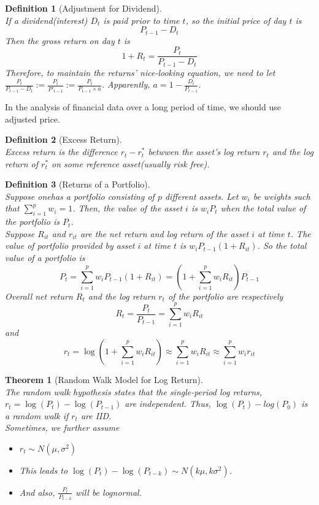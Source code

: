 \documentclass[12pt]{article}
\newtheorem{definition}{Definition}[section]
\newtheorem{theorem}{Theorem}[section]
\theoremstyle{definition}
\begin{document}
\begin{definition}[Adjustment for Dividend]
\hfill\\\normalfont If a dividend(interest) $D_t$ is paid prior to time $t$, so the initial price of day $t$ is 
\[
P_{t-1}-D_t
\]
Then the gross return on day $t$ is
\[
1+R_t=\frac{P_t}{P_{t-1}-D_t}
\]
Therefore, to maintain the returns' nice-looking equation, we need to let $\frac{P_t}{P_{t-1}-D_t}:=\frac{P_t}{P'_{t-1}}:=\frac{P_t}{P_{t-1}\times a}$.
Apparently, $a=1-\frac{D_t}{P_{t-1}}$.
\end{definition}
In the analysis of financial data over a long period of time, we should use adjusted price.
\begin{definition}[Excess Return]
\hfill\\\normalfont Excess return is the difference $r_t-r_t^\ast$ betwwen the asset's log return $r_t$ and the log return of $r_t^\ast$ on some reference asset(usually risk free).
\end{definition}
\begin{definition}[Returns of a Portfolio]
\hfill\\\normalfont Suppose onehas a portfolio consisting of $p$ different assets. Let $w_i$ be weights such that $\sum_{i=1}^p w_i = 1$. Then, the value of the asset $i$ is $w_iP_t$ when the total value of the portfolio is $P_t$.\\
Suppose $R_{it}$ and $r_{it}$ are the net return and log return of the asset $i$ at time $t$. The value of portfolio provided by asset $i$ at time $t$ is $w_iP_{t-1}(1+R_{it})$. So the total value of a portfolio is
\[
P_t=\sum_{i=1}^p w_{i}P_{t-1}(1+R_{it}) = (1+\sum_{i=1}^p w_iR_{it})P_{t-1}
\]
Overall net return $R_t$ and the log return $r_t$ of the portfolio are respectively
\[
R_t=\frac{P_t}{P_{t-1}}=\sum_{i=1}^p w_iR_{it}
\]
and
\[
r_t=\log(1+\sum_{i=1}^p w_iR_{it})\approx \sum_{i=1}^p w_iR_{it} \approx\sum_{i=1}^p w_ir_{it}
\]
\end{definition}
\begin{theorem}[Random Walk Model for Log Return]
\hfill\\\normalfont The random walk hypothesis states that the single-period log returns, $r_t=\log(P_t)-\log(P_{t-1})$ are independent. Thus, $\log(P_t) - log(P_0)$ is a random walk if $r_t$ are IID.\\
Sometimes, we further assume
\begin{itemize}
  \item $r_t\sim N(\mu, \sigma^2)$
  \item This leads to $\log(P_t)-\log(P_{t-k})\sim N(k\mu,k\sigma^2)$.
  \item And also, $\frac{P_t}{P_{t-k}}$ will be lognormal.
\end{itemize}
\end{theorem}
\end{document}
